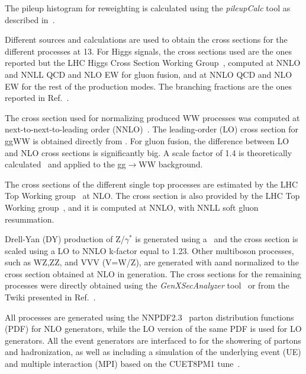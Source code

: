 The pileup histogram for reweighting is calculated using the \emph{pileupCalc} tool as described in~\cite{puJSON}. 


Different sources and calculations are used to obtain the cross sections for the different processes at 13\TeV. 
For Higgs signals, the cross sections used are the ones reported but the LHC Higgs Cross Section Working Group~\cite{temphiggsxsecs},
computed at NNLO and NNLL QCD and NLO EW for gluon fusion, and at NNLO QCD and NLO EW for the rest of the production modes.
The branching fractions are the ones reported in Ref.~\cite{Heinemeyer:2013tqa}. 

The cross section used for normalizing \qqbar produced WW processes was computed at next-to-next-to-leading order
(NNLO)~\cite{Gehrmann:2014fva}. The leading-order (LO) cross section for ggWW is obtained directly from \MCFM.
For gluon fusion, the difference between LO and NLO cross sections is significantly big.
A scale factor of 1.4 is theoretically calculated~\cite{Caola:2015rqy} and applied to the gg$\to$WW background. 


The cross sections of the different single top processes are estimated by the LHC Top Working group~\cite{singletop} at NLO.
The \ttbar cross section is also provided by the LHC Top Working group~\cite{topxsec}, and it is computed at NNLO, with NNLL soft gluon resummation. 

Drell-Yan (DY) production of Z/$\gamma^{*}$ is generated using a\MADGRAPH~\cite{Alwall:2014hca} and the cross section is scaled using a LO to NNLO k-factor equal to 1.23. 
Other multiboson processes, such as WZ,ZZ, and VVV (V=W/Z), are generated with a\MCATNLO and normalized
to the cross section obtained at NLO in generation.
The cross sections for the remaining processes were directly obtained using the \emph{GenXSecAnalyzer}
tool~\cite{genxsec} or from the Twiki presented in Ref.~\cite{25nstwiki}.

All processes are generated using the NNPDF2.3~\cite{Ball:2013hta,Ball:2011uy} parton distribution functions (PDF) for NLO generators,
while the LO version of the same PDF is used for LO generators. All the event generators are interfaced 
to  for the showering of partons and hadronization, as well as including a simulation of the 
underlying event (UE) and multiple interaction (MPI) based on the CUET8PM1 tune~\cite{Khachatryan:2015pea}.






